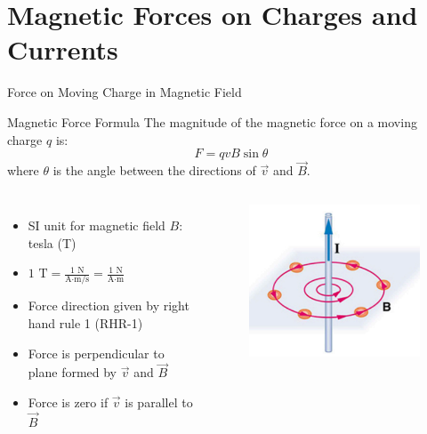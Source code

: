 \documentclass{beamer}
\begin{document}
\section{Magnetic Forces on Charges and Currents}

\begin{frame}{Force on Moving Charge in Magnetic Field}
\begin{block}{Magnetic Force Formula}
The magnitude of the magnetic force on a moving charge $q$ is:
\begin{equation}
F = qvB\sin\theta
\end{equation}
where $\theta$ is the angle between the directions of $\vec{v}$ and $\vec{B}$.
\end{block}

\begin{columns}
\begin{itemize}
\item SI unit for magnetic field $B$: tesla (T)
\item $1 \text{ T} = \frac{1 \text{ N}}{\text{A}\cdot\text{m/s}} = \frac{1 \text{ N}}{\text{A}\cdot\text{m}}$
\item Force direction given by right hand rule 1 (RHR-1)
\item Force is perpendicular to plane formed by $\vec{v}$ and $\vec{B}$
\item Force is zero if $\vec{v}$ is parallel to $\vec{B}$
\end{itemize}

\begin{figure}
    \centering
    \includegraphics[width=0.75\linewidth]{mgngd.png}
\end{figure}
\end{columns}
\end{frame}
\end{document}
